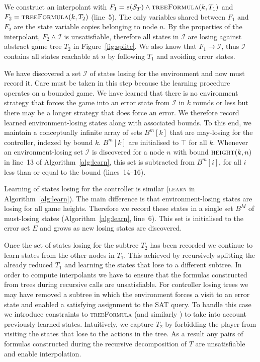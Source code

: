 We construct an interpolant with $F_1 = s(\mathcal{S}_T) \land \textsc{treeFormula}(k, T_1)$ and $F_2 = \textsc{treeFormula}(k, T_2)$ (line~5). The only variables shared between $F_1$ and $F_2$ are the state variable copies belonging to node $n$. By the properties of the interpolant, $F_2 \land \mathcal{I}$ is unsatisfiable, therefore all states in $\mathcal{I}$ are losing against abstract game tree $T_2$ in Figure~\ref{fig:splitc}.  We also know that $F_1 \to \mathcal{I}$, thus $\mathcal{I}$ contains all states reachable at $n$ by following $T_1$ and avoiding error states.  

We have discovered a set $\mathcal{I}$ of states losing for the environment and now must record it. Care must be taken in this step because the learning procedure operates on a bounded game. We have learned that there is no environment strategy that forces the game into an error state from $\mathcal{I}$ in $k$ rounds or less but there may be a longer strategy that does force an error.  We therefore record learned environment-losing states along with associated bounds.  To this end, we maintain a conceptually infinite array of sets $B^m[k]$ that are may-losing for the controller, indexed by bound $k$.  $B^m[k]$ are initialised to $\top$ for all $k$.  Whenever an environment-losing set $\mathcal{I}$ is discovered for a node $n$ with bound $\textsc{height}(k, n)$ in line~13 of Algorithm~\ref{alg:learn}, this set is subtracted from $B^m[i]$, for all $i$ less than or equal to the bound (lines~14--16).

Learning of states losing for the controller is similar (\textsc{learn} in Algorithm~\ref{alg:learn}). The main difference is that environment-losing states are losing for all game heights. Therefore we record these states in a single set $B^M$ of must-losing states (Algorithm~\ref{alg:learn}, line~6).  This set is initialised to the error set $E$ and grows as new losing states are discovered.  

Once the set of states losing for the subtree $T_2$ has been recorded we continue to learn states from the other nodes in $T_1$. This achieved by recursively splitting the already reduced $T_1$ and learning the states that lose to a different subtree. In order to compute interpolants we have to ensure that the formulas constructed from trees during recursive calls are unsatisfiable. For controller losing trees we may have removed a subtree in which the environment forces a visit to an error state and enabled a satisfying assignment to the SAT query. To handle this case we introduce constraints to \textsc{treeFormula} (and similarly ) to take into account previously learned states. Intuitively, we capture $T_2$ by forbidding the player from visiting the states that lose to the actions in the tree. As a result any pairs of formulas constructed during the recursive decomposition of $T$ are unsatisfiable and enable interpolation.

